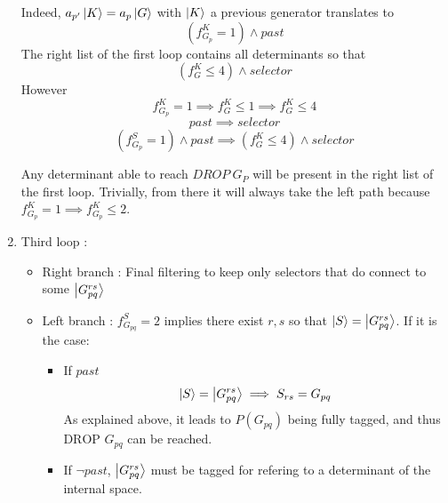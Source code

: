 \documentclass[./thesis.tex]{subfiles}
\newcommand{\Gpqrs}{\ket{G^{rs}_{pq}}}
\begin{document}
\begin{enumerate}
Indeed, $a_{p'} \ket K = a_p \ket G$ with $\ket K$ a previous generator translates to
\begin{equation}
(f^K_{G_{p}} = 1) \wedge past
\end{equation}
The right list of the first loop contains all determinants so that
\begin{equation}
(f^K_G \leq 4) \wedge selector
\end{equation}
However 
\begin{equation}
f^K_{G_{p}} = 1 \implies f^K_G \leq 1 \implies f^K_G \leq 4
\end{equation}
\begin{equation}
past \implies selector
\end{equation}
\begin{equation}
(f^S_{G_{p}} = 1) \wedge past \implies (f^K_G \leq 4) \wedge selector
\end{equation}

Any determinant able to reach $DROP\ G_P$ will be present in the right list of the first loop. Trivially, from there it will always take the left path because $f^K_{G_{p}} = 1 \implies f^K_{G_{p}} \leq 2$.

\item
Third loop :
\begin{itemize}

\item
Right branch :
Final filtering to keep only selectors that do connect to some $\Gpqrs$
\item
Left branch : $f_{G_{pq}}^S = 2$ implies there exist $r,s$ so that $\ket S=\Gpqrs$. If it is the case:
\begin{itemize}
\item
If $past$
\begin{equation}
\ket S=\ket {G_{pq}^{rs}} \implies S_{rs} = G_{pq}
\end{equation}
As explained above, it leads to $P(G_{pq})$ being fully tagged, and thus $\text{DROP } G_{pq}$ can be reached.
\item
If $\neg past$, $\ket {G_{pq}^{rs}}$ must be tagged for refering to a determinant of the internal space.
\end{itemize}



\end{itemize}

\end{enumerate}



\newcommand{\Gpq}{\ket {G_{pq}}}
\newcommand{\Gpbq}{\ket {G_{p \bar q}}}
\end{document}
